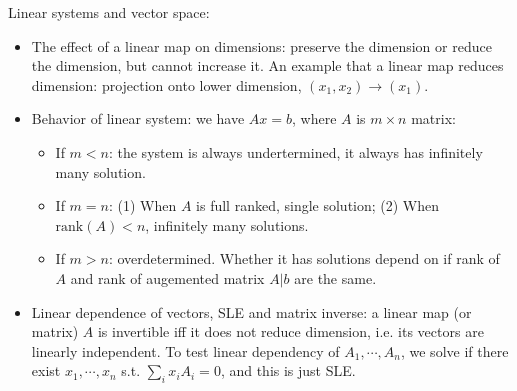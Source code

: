\documentclass{report}
\begin{document}
Linear systems and vector space: 
\begin{itemize}
	\item The effect of a linear map on dimensions: preserve the dimension or reduce the dimension, but cannot increase it. An example that a linear map reduces dimension: projection onto lower dimension, $(x_1, x_2) \rightarrow (x_1)$. 
	
	\item Behavior of linear system: we have $Ax = b$, where $A$ is $m \times n$ matrix: 
	\begin{itemize}
		\item If $m < n$: the system is always undertermined, it always has infinitely many solution. 
		\item If $m = n$: (1) When $A$ is full ranked, single solution; (2) When $\text{rank}(A) < n$, infinitely many solutions. 
		\item If $m > n$: overdetermined. Whether it has solutions depend on if rank of $A$ and rank of augemented matrix $A|b$ are the same. 
	\end{itemize}
	
	\item Linear dependence of vectors, SLE and matrix inverse: a linear map (or matrix) $A$ is invertible iff it does not reduce dimension, i.e. its vectors are linearly independent. To test linear dependency of $A_1, \cdots, A_n$, we solve if there exist $x_1, \cdots, x_n$ s.t. $\sum_i x_i A_i = 0$, and this is just SLE. 
\end{itemize}
\end{document}
